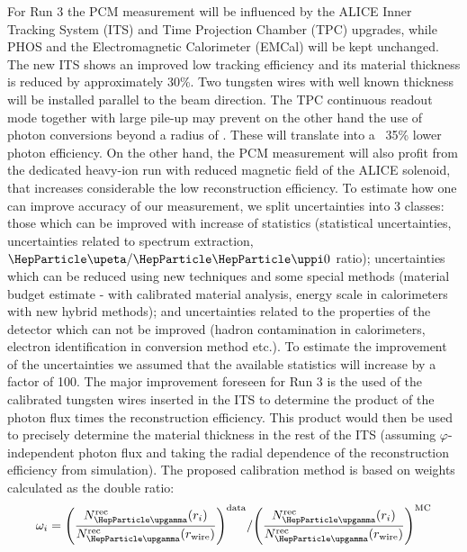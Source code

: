 For Run 3 the PCM measurement will be influenced by the ALICE Inner Tracking System (ITS) and Time Projection Chamber (TPC) upgrades, while PHOS and the Electromagnetic Calorimeter (EMCal) will be kept unchanged. 
The new ITS shows an improved low \pT{} tracking efficiency and its material thickness is reduced by approximately 30\%. Two \unit[1]{\Umm} tungsten wires with well known thickness will be installed parallel to the beam direction. 
The TPC continuous readout mode together with large pile-up may prevent on the other hand the use of photon conversions beyond a radius of \unit[35]{\Ucm}. These will translate
into a ~35\% lower photon efficiency. On the other hand, the PCM measurement will also profit from the dedicated heavy-ion run with reduced magnetic field of the ALICE solenoid, that increases considerable the low \pT{} reconstruction efficiency.
To estimate how one can improve accuracy of our measurement, we split uncertainties into 3 classes: those which can be improved with increase of statistics (statistical uncertainties, uncertainties related to \PGpz spectrum extraction, $\PGh/\PGpz$ ratio); uncertainties which can be reduced using new techniques and some special methods (material budget estimate - with calibrated material analysis, energy scale in calorimeters with new hybrid \PGpz methods); and uncertainties related to the properties of the detector which can not be improved (hadron contamination in calorimeters, electron identification in conversion method etc.). To estimate the improvement of the uncertainties we assumed that the available statistics will increase by a factor of 100. 
The major improvement foreseen for Run 3 is the used of the calibrated tungsten wires
inserted in the ITS to determine the product of the photon flux times the \PGg reconstruction efficiency. This product would then be used to precisely determine the material thickness in the rest of the ITS (assuming $\varphi$-independent photon flux and taking the radial dependence of the reconstruction efficiency from simulation).
The proposed calibration method is based on weights calculated 
as the double ratio: 
\begin{equation}
\omega_i= 
{\left(\frac{N_{\PGg}^{\rm rec}(r_i)}{N_{\PGg}^{\rm rec}(r_{\rm wire})}\right)^{\rm data}} /
{\left(\frac{N_{\PGg}^{\rm rec}(r_i)}{N_{\PGg}^{\rm rec}(r_{\rm wire})}\right)^{\rm MC}} 
\end{equation}
